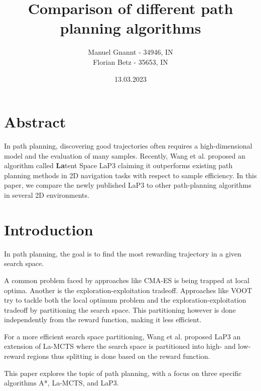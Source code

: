 \documentclass[bibliography=totoc]{scrartcl}
\title{Comparison of different path planning algorithms}
\author{Manuel Gnannt - 34946, IN \\ Florian Betz - 35653, IN}
\date{13.03.2023}%
\begin{document}
\maketitle
\tableofcontents

\clearpage
\section{Abstract}
In path planning, discovering good trajectories often requires a high-dimensional model and the evaluation of many samples. Recently, Wang et al. proposed an algorithm called \textbf{La}tent Space \ac{LaP3} claiming it outperforms existing path planning methods in 2D navigation tasks with respect to sample efficiency. In this paper, we compare the newly published \ac{LaP3} to other path-planning algorithms in several 2D environments.

\section{Introduction}
In path planning, the goal is to find the most rewarding trajectory in a given search space. 

A common problem faced by approaches like CMA-ES \cite{CMA-ES} is being trapped at local optima. 
Another is the exploration-exploitation tradeoff. 
Approaches like VOOT \cite{VOOT} try to tackle both the local optimum problem and the exploration-exploitation tradeoff by partitioning the search space.
This partitioning however is done independently from the reward function, making it less efficient.

For a more efficient search space partitioning, Wang et al. proposed \ac{LaP3} an extension of \ac{La-MCTS} \cite{La-MCTS} where the search space is  partitioned into high- and low-reward regions thus splitting is done based on the reward function.

This paper explores the topic of path planning, with a focus on three specific algorithms A*, \ac{La-MCTS}, and \ac{LaP3}. 

\end{document}
